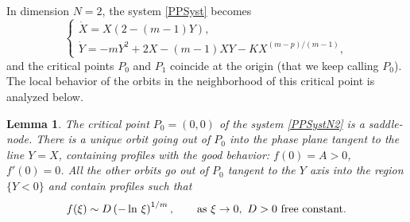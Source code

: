 \documentclass[a4paper,11pt]{article}
\newtheorem{lemma}[theorem]{Lemma}
\numberwithin{equation}{section}
\begin{document}
In dimension $N=2$, the system \eqref{PPSyst} becomes
\begin{equation}\label{PPSystN2}
\left\{\begin{array}{ll}\dot{X}=X(2-(m-1)Y),\\ \dot{Y}=-mY^2+2X-(m-1)XY-KX^{(m-p)/(m-1)},\end{array}\right.
\end{equation}
and the critical points $P_0$ and $P_1$ coincide at the origin (that we keep calling $P_0$). The local behavior of the orbits in the neighborhood of this critical point is analyzed below.
\begin{lemma}\label{lem.P0P1}
The critical point $P_0=(0,0)$ of the system \eqref{PPSystN2} is a saddle-node. There is a unique orbit going out of $P_0$ into the phase plane tangent to the line $Y=X$, containing profiles with the good behavior: $f(0)=A>0$, $f'(0)=0$. All the other orbits go out of $P_0$ tangent to the $Y$ axis into the region $\{Y<0\}$ and contain profiles such that
\begin{equation}\label{beh.P02}
f(\xi)\sim D\left(-\ln\,\xi\right)^{1/m}, \qquad {\rm as} \ \xi\to0, \ D>0 \ {\rm free \ constant}.
\end{equation}
\end{lemma}
\end{document}
